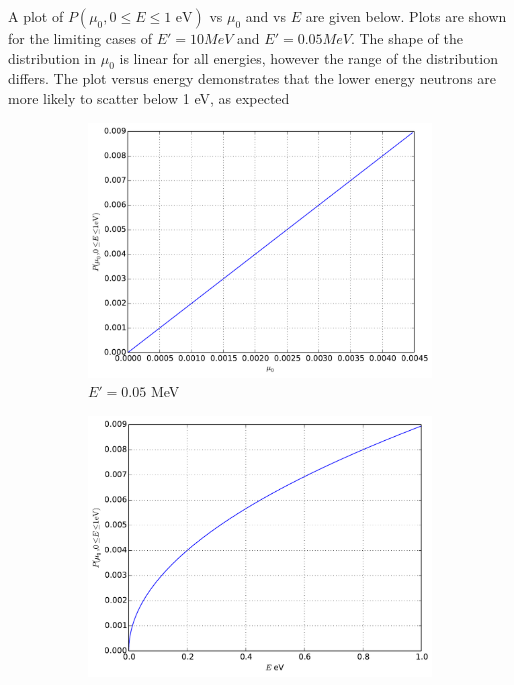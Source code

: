 \documentclass[12pt]{article}
\newenvironment{solution}[1][Solution]{\begin{trivlist}
\item[\hskip \labelsep {\bfseries #1} {\hspace{-0.2em}\bfseries:}]\hspace{0.3in}\newline}{\end{trivlist}}
\begin{document}
\begin{solution}
A plot of $P(\mu_0,0\leq E \leq 1\text{ eV})$ vs $\mu_0$ and vs $E$ are given below.
Plots are shown for the limiting cases of $E'=10 MeV$ and $E'=0.05 MeV$.  The shape of the
distribution in $\mu_0$ is linear for all energies, however the range of the
distribution differs.  The plot versus energy demonstrates
that the lower energy neutrons are more likely to scatter below 1 eV, as expected
\begin{figure}[hb]
    \begin{subfigure}{0.5\textwidth}
    \includegraphics[width=\textwidth]{scat_kernel_05.pdf}
    \caption{$E'=0.05$ MeV}
\end{subfigure}
    \begin{subfigure}{0.5\textwidth}
    \includegraphics[width=\textwidth]{scat_kernel_E_05.pdf}

\end{subfigure}
\end{figure}
\end{solution}
\end{document}
